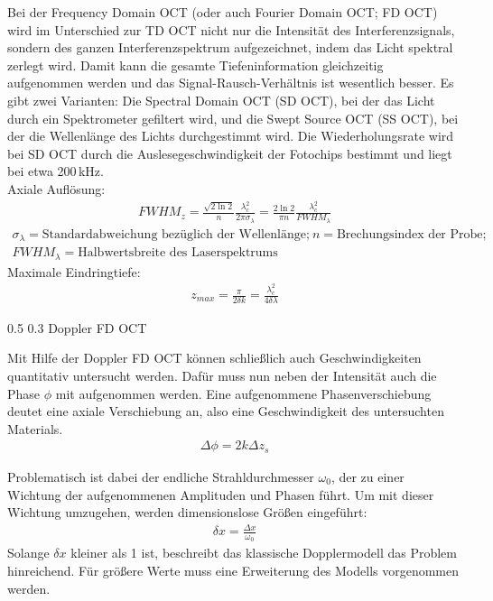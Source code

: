 \documentclass[german, %
parskip=full, %
bibliography=totoc, %
]{scrartcl}
\makeatletter
\renewcommand\subsection{\@startsection 
   {subsection}{2}{0mm}%
   {0.5\baselineskip}%
   {0.3\baselineskip}%
   {\bfseries\sffamily\large}%
   }
\makeatother
\begin{document}
Bei der Frequency Domain OCT (oder auch Fourier Domain OCT; FD OCT) wird im Unterschied zur TD OCT nicht nur die Intensität des Interferenzsignals, sondern des ganzen Interferenzspektrum aufgezeichnet, indem das Licht spektral zerlegt wird. Damit kann die gesamte Tiefeninformation gleichzeitig aufgenommen werden und das Signal-Rausch-Verhältnis ist wesentlich besser. Es gibt zwei Varianten: Die Spectral Domain OCT (SD OCT), bei der das Licht durch ein Spektrometer gefiltert wird, und die Swept Source OCT (SS OCT), bei der die Wellenlänge des Lichts durchgestimmt wird. Die Wiederholungsrate wird bei SD OCT durch die Auslesegeschwindigkeit der Fotochips bestimmt und liegt bei etwa 200\,kHz. \\
Axiale Auflösung:
\begin{align}
FWHM_z = \frac{\sqrt{2 \ln 2}}{n}\frac{\lambda_c^2}{2 \pi \sigma_\lambda} = \frac{2 \ln 2}{\pi n}\frac{\lambda_c^2}{FWHM_\lambda} 
\end{align}
\begin{align*}
\sigma_\lambda = \text{Standardabweichung bezüglich der Wellenlänge;} \ n = \text{Brechungsindex der Probe;} \\ FWHM_\lambda = \text{Halbwertsbreite des Laserspektrums}
\end{align*}
Maximale Eindringtiefe:
\begin{align}
z_{max} = \frac{\pi}{2 \delta k} = \frac{\lambda_c^2}{4 \delta \lambda}
\end{align}

\subsection{Doppler FD OCT}

Mit Hilfe der Doppler FD OCT können schließlich auch Geschwindigkeiten quantitativ untersucht werden. Dafür muss nun neben der Intensität auch die Phase $\phi$ mit aufgenommen werden. Eine aufgenommene Phasenverschiebung deutet eine axiale Verschiebung an, also eine Geschwindigkeit des untersuchten Materials.
\begin{align}
\Delta \phi = 2 k \Delta z_s
\end{align}

Problematisch ist dabei der endliche Strahldurchmesser $\omega_0$, der zu einer Wichtung der aufgenommenen Amplituden und Phasen führt. Um mit dieser Wichtung umzugehen, werden dimensionslose Größen eingeführt:
\begin{align}
\delta x = \frac{\Delta x}{\omega _0}
\end{align}
Solange $\delta x$ kleiner als 1 ist, beschreibt das klassische Dopplermodell das Problem hinreichend. Für größere Werte muss eine Erweiterung des Modells vorgenommen werden.
\end{document}

